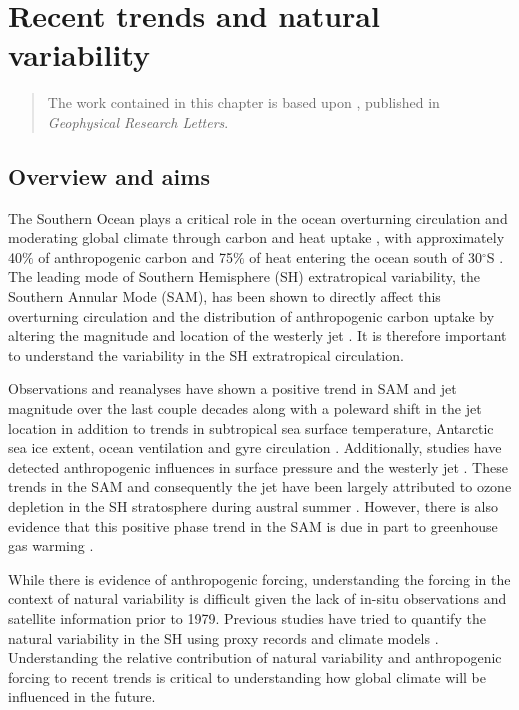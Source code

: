 \chapter{Recent trends and natural variability}
\label{cha:SHcirc}

\begin{quotation}
  The work contained in this chapter is based upon \citet{Thomas2015},
  published in \emph{Geophysical Research Letters}.
\end{quotation}

\section{Overview and aims}

The Southern Ocean plays a critical role in the ocean overturning circulation
and moderating global climate through carbon and heat uptake
\citep{Khatiwala2009,Gnanadesikan1999}, with approximately 40$\%$ of
anthropogenic carbon and 75$\%$ of heat entering the ocean south of 30$^\circ$S
\citep{Frolicher2015,Sabine2004}. The leading mode of Southern Hemisphere
(SH) extratropical variability, the Southern Annular Mode (SAM), has been shown
to directly affect this overturning circulation and the distribution of
anthropogenic carbon uptake by altering the magnitude and location of the
westerly jet \citep{Hall2002b,Mignone2006b,SenGupta2006e}.  It is
therefore important to understand the variability in the SH extratropical
circulation.

Observations and reanalyses have shown a positive trend in SAM and jet magnitude
over the last couple decades along with a poleward shift in the jet location
\citep{Thompson2000b,Thompson2002e} in addition to trends in subtropical sea
surface temperature, Antarctic sea ice extent, ocean ventilation and gyre
circulation \citep{Parkinson2012c,Swart2012a,Waugh2013b,Roemmich2007b}.
Additionally, studies have detected anthropogenic influences in surface pressure
and the westerly jet \citep{Gillett2003,Gillett2005}. These trends in the
SAM and consequently the jet have been largely attributed to ozone depletion in
the SH stratosphere during austral summer \citep{Previdi2014f,Gillett2013,
Gillett2003a}. However, there is also evidence that this positive phase trend
in the SAM is due in part to greenhouse gas warming \citep{Arblaster2006,
Lee2013f,Gillett2013}.

While there is evidence of anthropogenic forcing, understanding the forcing in
the context of natural variability is difficult given the lack of in-situ
observations and satellite information prior to 1979. Previous studies have
tried to quantify the natural variability in the SH using proxy records
\citep{MARSHALL2003,Visbeck2009} and climate models \citep{Latif2013}.
Understanding the relative contribution of natural variability and anthropogenic
forcing to recent trends is critical to understanding how global climate will be
influenced in the future.

